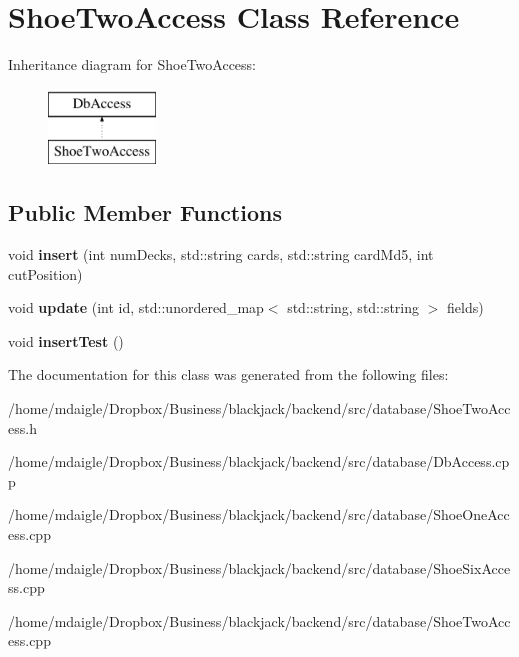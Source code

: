 \hypertarget{classShoeTwoAccess}{
\section{\-Shoe\-Two\-Access \-Class \-Reference}
\label{classShoeTwoAccess}
}
\-Inheritance diagram for \-Shoe\-Two\-Access\-:\begin{figure}[H]
\begin{center}
\leavevmode
\includegraphics[height=2.000000cm]{classShoeTwoAccess}
\end{center}
\end{figure}
\subsection*{\-Public \-Member \-Functions}
\begin{DoxyCompactItemize}
\item 
\hypertarget{classShoeTwoAccess_a13c015abcde2c12aedb96906883ddd67}{
void {\bfseries insert} (int num\-Decks, std\-::string cards, std\-::string card\-Md5, int cut\-Position)}
\label{classShoeTwoAccess_a13c015abcde2c12aedb96906883ddd67}

\item 
\hypertarget{classShoeTwoAccess_a9c884b5cec8c7453a36bc0c14a5b8f6f}{
void {\bfseries update} (int id, std\-::unordered\-\_\-map$<$ std\-::string, std\-::string $>$ fields)}
\label{classShoeTwoAccess_a9c884b5cec8c7453a36bc0c14a5b8f6f}

\item 
\hypertarget{classShoeTwoAccess_ab408e44f340297526a1fecc79cd52c18}{
void {\bfseries insert\-Test} ()}
\label{classShoeTwoAccess_ab408e44f340297526a1fecc79cd52c18}

\end{DoxyCompactItemize}


\-The documentation for this class was generated from the following files\-:\begin{DoxyCompactItemize}
\item 
/home/mdaigle/\-Dropbox/\-Business/blackjack/backend/src/database/\-Shoe\-Two\-Access.\-h\item 
/home/mdaigle/\-Dropbox/\-Business/blackjack/backend/src/database/\-Db\-Access.\-cpp\item 
/home/mdaigle/\-Dropbox/\-Business/blackjack/backend/src/database/\-Shoe\-One\-Access.\-cpp\item 
/home/mdaigle/\-Dropbox/\-Business/blackjack/backend/src/database/\-Shoe\-Six\-Access.\-cpp\item 
/home/mdaigle/\-Dropbox/\-Business/blackjack/backend/src/database/\-Shoe\-Two\-Access.\-cpp\end{DoxyCompactItemize}
